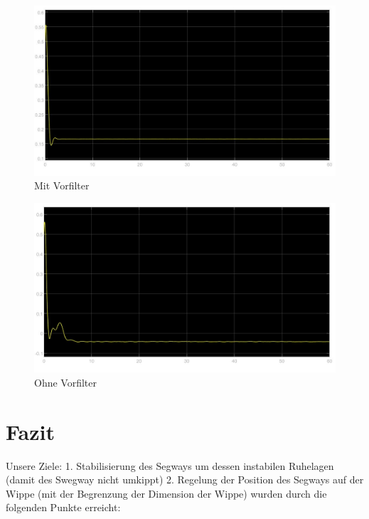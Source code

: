 \documentclass[pdf]{ifacconf}
\begin{document}
\begin{figure}[h]	
\centerline{\includegraphics[width=\linewidth]{Bilder/Plots/MitVorfilter.jpg}}
	\caption{Mit Vorfilter}
	\label{fig:MitVorfilter}
\end{figure}

\begin{figure}[h]	
\centerline{\includegraphics[width=\linewidth]{Bilder/Plots/OhneVorfilter.jpg}}	
	\caption{Ohne Vorfilter}
	\label{fig:OhneVorfilter}
\end{figure}




\section{Fazit}

Unsere Ziele: 1. Stabilisierung des Segways um dessen instabilen Ruhelagen (damit des Swegway nicht umkippt) 2. Regelung der Position des Segways auf der Wippe (mit der Begrenzung der Dimension der Wippe) wurden durch die folgenden Punkte erreicht:
\end{document}
